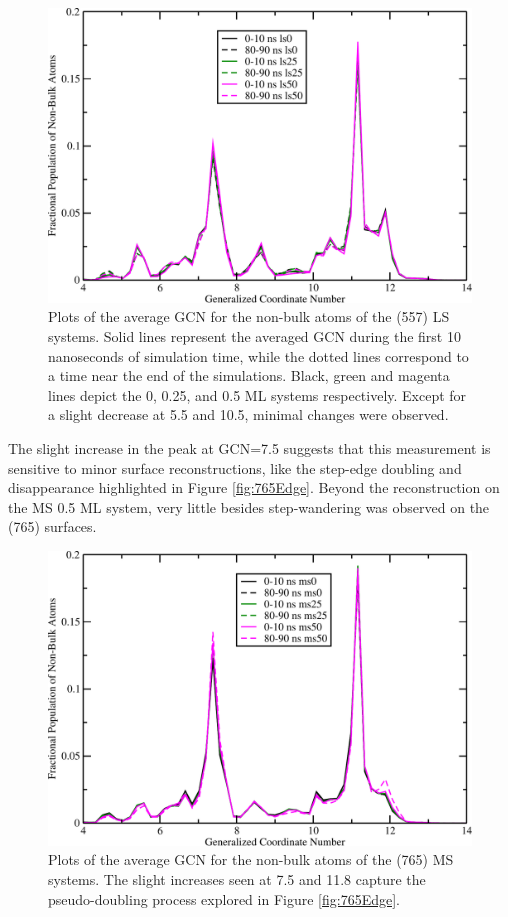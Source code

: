 \begin{figure}
\centering
\includegraphics[width=0.9\linewidth]{../figures/appB/557ls_GCNF.pdf}
\caption{Plots of the average GCN for the non-bulk atoms of the  (557)
LS systems. Solid lines represent the averaged GCN during the first 10
nanoseconds of simulation time, while the dotted lines correspond to a time
near the end of the simulations. Black, green and magenta lines depict the 0,
0.25, and 0.5 ML systems respectively. Except for a slight decrease at 5.5 and
10.5, minimal changes were observed.}
\label{fig:557lsGCN}
\end{figure}
\newpage


The slight increase in the peak at GCN=7.5 suggests that this measurement is
sensitive to minor surface reconstructions, like the step-edge doubling and
disappearance highlighted in Figure \ref{fig:765Edge}. Beyond the
reconstruction on the MS 0.5 ML system, very little besides step-wandering was
observed on the (765) surfaces.

\begin{figure}
\centering
\includegraphics[width=0.9\linewidth]{../figures/appB/765ms_GCNF.pdf}
\caption{Plots of the average GCN for the non-bulk atoms of the  (765)
MS systems. The slight increases seen at 7.5 and 11.8 capture the
pseudo-doubling process explored in Figure \ref{fig:765Edge}.}
\label{fig:765msGCN}
\end{figure}
\newpage

